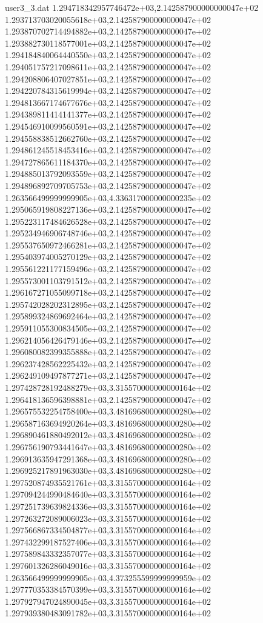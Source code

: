 \begin{filecontents}{user3_3.dat}
1.294718342957746472e+03,2.142587900000000047e+02
1.293713703020055618e+03,2.142587900000000047e+02
1.293870702714494882e+03,2.142587900000000047e+02
1.293882730118577001e+03,2.142587900000000047e+02
1.294184840064440550e+03,2.142587900000000047e+02
1.294051757217098611e+03,2.142587900000000047e+02
1.294208806407027851e+03,2.142587900000000047e+02
1.294220784315619994e+03,2.142587900000000047e+02
1.294813667174677676e+03,2.142587900000000047e+02
1.294389811414141377e+03,2.142587900000000047e+02
1.294546910099560591e+03,2.142587900000000047e+02
1.294558838512662760e+03,2.142587900000000047e+02
1.294861245518453416e+03,2.142587900000000047e+02
1.294727865611184370e+03,2.142587900000000047e+02
1.294885013792093559e+03,2.142587900000000047e+02
1.294896892709705753e+03,2.142587900000000047e+02
1.263566499999999905e+03,4.336317000000000235e+02
1.295065919808227136e+03,2.142587900000000047e+02
1.295223117484626528e+03,2.142587900000000047e+02
1.295234946906748746e+03,2.142587900000000047e+02
1.295537650972466281e+03,2.142587900000000047e+02
1.295403974005270129e+03,2.142587900000000047e+02
1.295561221177159496e+03,2.142587900000000047e+02
1.295573001103791512e+03,2.142587900000000047e+02
1.296167271055099718e+03,2.142587900000000047e+02
1.295742028202312895e+03,2.142587900000000047e+02
1.295899324869692464e+03,2.142587900000000047e+02
1.295911055300834505e+03,2.142587900000000047e+02
1.296214056426479146e+03,2.142587900000000047e+02
1.296080082399355888e+03,2.142587900000000047e+02
1.296237428562225432e+03,2.142587900000000047e+02
1.296249109497877271e+03,2.142587900000000047e+02
1.297428728192488279e+03,3.315570000000000164e+02
1.296418136596398881e+03,2.142587900000000047e+02
1.296575532254758400e+03,3.481696800000000280e+02
1.296587163694920264e+03,3.481696800000000280e+02
1.296890461880492012e+03,3.481696800000000280e+02
1.296756190793441647e+03,3.481696800000000280e+02
1.296913635947291368e+03,3.481696800000000280e+02
1.296925217891963030e+03,3.481696800000000280e+02
1.297520874935521761e+03,3.315570000000000164e+02
1.297094244990484640e+03,3.315570000000000164e+02
1.297251739639824336e+03,3.315570000000000164e+02
1.297263272089006023e+03,3.315570000000000164e+02
1.297566867334504877e+03,3.315570000000000164e+02
1.297432299187527406e+03,3.315570000000000164e+02
1.297589843332357077e+03,3.315570000000000164e+02
1.297601326286049016e+03,3.315570000000000164e+02
1.263566499999999905e+03,4.373255599999999959e+02
1.297770353384570399e+03,3.315570000000000164e+02
1.297927947024890045e+03,3.315570000000000164e+02
1.297939380483091782e+03,3.315570000000000164e+02

\end{filecontents}
